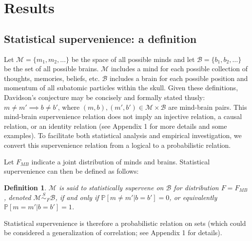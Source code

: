 \documentclass{article}
\newcommand{\mB}{\mathcal{B}}
\newcommand{\mM}{\mathcal{M}}
\newcommand{\PP}{\mathbb{P}}           %
\providecommand{\mc}[1]{\mathcal{#1}}
\newtheorem{defi}{Definition}
\begin{document}



\section*{Results}

\subsection*{Statistical supervenience: a definition} %

\noindent Let $\mc{M}=\{m_1, m_2, \ldots\}$ be the space of all possible minds and
let $\mc{B}=\{b_1,b_2,\ldots\}$ be the set of all possible brains.  $\mc{M}$ includes a mind for each possible collection of thoughts, memories, beliefs, etc.
$\mc{B}$ includes a brain for each possible position and momentum of all subatomic particles within the skull.  
Given these definitions, Davidson's conjecture may be concisely and formally stated thusly:  $m \neq m' \implies b \neq b'$, where $(m,b), (m',b') \in \mc{M} \times \mc{B}$ are mind-brain pairs.  This mind-brain supervenience relation does not imply an injective relation, a causal relation, or an identity relation (see Appendix 1 for more details and some examples).  To facilitate both statistical analysis and empirical investigation, we convert this supervenience relation from a logical to a probabilistic relation.  

Let $F_{MB}$ indicate a joint distribution of minds and brains. Statistical supervenience can then be defined as follows:
\begin{defi}
\label{def:1} 
$\mM$ is said to \textit{statistically supervene} on $\mB$ for distribution $F=F_{MB}$, denoted $\mM \overset{S}{\sim}_F \mB$, if and only if $\PP[m \neq m' | b=b']=0$, or equivalently $\PP[m = m' | b = b']=1$. 
\end{defi}
\noindent Statistical supervenience is therefore a probabilistic relation on sets (which could be considered a generalization of correlation; see Appendix 1 for details).  
\end{document}
